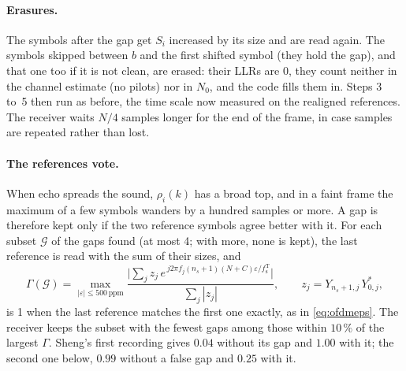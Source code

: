 \documentclass[11pt,a4paper]{article}
\newcommand{\fsT}{f_{\mathrm{s}}^{\mathrm{T}}}
\theoremstyle{remark}
\begin{document}
\paragraph{Erasures.} The symbols after the gap get $S_i$ increased by its size and are read again. The symbols skipped between $b$ and the first shifted symbol (they hold the gap), and that one too if it is not clean, are erased: their LLRs are 0, they count neither in the channel estimate (no pilots) nor in $N_0$, and the code fills them in. Steps 3 to~5 then run as before, the time scale now measured on the realigned references. The receiver waits $N/4$ samples longer for the end of the frame, in case samples are repeated rather than lost.

\paragraph{The references vote.} When echo spreads the sound, $\rho_i(k)$ has a broad top, and in a faint frame the maximum of a few symbols wanders by a hundred samples or more. A gap is therefore kept only if the two reference symbols agree better with it. For each subset $\mathcal G$ of the gaps found (at most 4; with more, none is kept), the last reference is read with the sum of their sizes, and
\begin{equation}
\Gamma(\mathcal G) = \max_{|\varepsilon| \le 500\,\mathrm{ppm}} \frac{\bigl|\sum_j z_j\, e^{\,j 2\pi f_j (n_s + 1)(N + C)\varepsilon/\fsT}\bigr|}{\sum_j |z_j|}, \qquad z_j = Y_{n_s+1,j}\, Y_{0,j}^{*},
\end{equation}
is 1 when the last reference matches the first one exactly, as in \cref{eq:ofdmeps}. The receiver keeps the subset with the fewest gaps among those within $10\,\%$ of the largest $\Gamma$. Sheng's first recording gives $0.04$ without its gap and $1.00$ with it; the second one below, $0.99$ without a false gap and $0.25$ with it.
\end{document}
